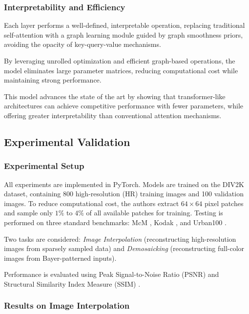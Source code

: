 \documentclass{article}
\theoremstyle{plain}
\theoremstyle{definition}
\theoremstyle{remark}
\begin{document}
\subsubsection{Interpretability and Efficiency}

Each layer performs a well-defined, interpretable operation, replacing traditional self-attention with a graph learning module guided by graph smoothness priors, avoiding the opacity of key-query-value mechanisms.

By leveraging unrolled optimization and efficient graph-based operations, the model eliminates large parameter matrices, reducing computational cost while maintaining strong performance.

This model advances the state of the art by showing that transformer-like architectures can achieve competitive performance with fewer parameters, while offering greater interpretability than conventional attention mechanisms.

\subsection{Experimental Validation}

\subsubsection{Experimental Setup}

All experiments are implemented in PyTorch. Models are trained on the DIV2K dataset, containing 800 high-resolution (HR) training images and 100 validation images. To reduce computational cost, the authors extract $64 \times 64$ pixel patches and sample only $1\%$ to $4\%$ of all available patches for training. Testing is performed on three standard benchmarks: McM \cite{zhang2011color}, Kodak \cite{kodak1993}, and Urban100 \cite{huang2015single}.

Two tasks are considered: \textit{Image Interpolation} (reconstructing high-resolution images from sparsely sampled data) and \textit{Demosaicking} (reconstructing full-color images from Bayer-patterned inputs).

Performance is evaluated using Peak Signal-to-Noise Ratio (PSNR) and Structural Similarity Index Measure (SSIM) \cite{wang2004image}.

\subsubsection{Results on Image Interpolation}
\end{document}

